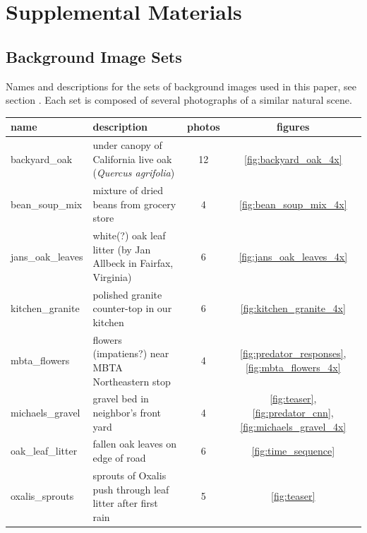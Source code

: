 \documentclass[letterpaper]{article}
\begin{document}

\appendix
\onecolumn
\section{Supplemental Materials}
\setcounter{page}{0}

\subsection{Background Image Sets}
\begin{minipage}{\linewidth}
Names and descriptions for the sets of background images used in this paper, see section . Each set is composed of several photographs of a similar natural scene.
\par
\hspace*{1cm}
\begin{minipage}{\linewidth-1.1cm}
\begin{table}[H]
\raggedright 
\begin{tabular}{ |l|l|c|c| }
\hline
\textbf{name} & \textbf{description} & \textbf{photos} & \textbf{figures} \\ 
\hline
backyard\_oak &
    under canopy of California live oak (\textit{Quercus agrifolia}) &
    12 & \ref{fig:backyard_oak_4x} \\
\hline
bean\_soup\_mix &
    mixture of dried beans from grocery store &
    4 & \ref{fig:bean_soup_mix_4x} \\
\hline
jans\_oak\_leaves &
    white(?) oak leaf litter (by Jan Allbeck in Fairfax, Virginia) &
    6 & \ref{fig:jans_oak_leaves_4x} \\
\hline
kitchen\_granite &
    polished granite counter-top in our kitchen &
    6 & \ref{fig:kitchen_granite_4x} \\
\hline
mbta\_flowers &
    flowers (impatiens?) near MBTA Northeastern stop &
    4 & \ref{fig:predator_responses}, \ref{fig:mbta_flowers_4x} \\
\hline
michaels\_gravel &
    gravel bed in neighbor’s front yard &
    4 & \ref{fig:teaser}, \ref{fig:predator_cnn}, \ref{fig:michaels_gravel_4x} \\
\hline
oak\_leaf\_litter &
    fallen oak leaves on edge of road &
    6 & \ref{fig:time_sequence} \\
\hline
oxalis\_sprouts &
    sprouts of Oxalis push through leaf litter after first rain &
    5 & \ref{fig:teaser} \\

\end{tabular}
\end{table}
\end{minipage}
\end{minipage}
\end{document}
